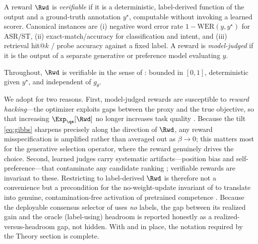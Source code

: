 \begin{definition}
\label{def:verifiable}
A reward $\Rwd$ is \emph{verifiable} if it is a deterministic, label-derived function of the output and a ground-truth annotation $y^\star$, computable without invoking a learned scorer. Canonical instances are (i) negative word error rate $1-\mathrm{WER}(y,y^\star)$ for ASR/ST, (ii) exact-match/accuracy for classification and intent, and (iii) retrieval hit$@k$ / probe accuracy against a fixed label. A reward is \emph{model-judged} if it is the output of a separate generative or preference model evaluating $y$.
\end{definition}

\begin{assumption}[Verifiability]
\label{ass:verifiable}
Throughout, $\Rwd$ is verifiable in the sense of : bounded in $[0,1]$, deterministic given $y^\star$, and independent of $g_\theta$.
\end{assumption}

We adopt  for two reasons. First, model-judged rewards are susceptible to \emph{reward hacking}---the optimizer exploits gaps between the proxy and the true objective, so that increasing $\Exp_{\qs}[\Rwd]$ no longer increases task quality \citep{skalse2022rewardhacking,gao2023overopt}. Because the tilt \eqref{eq:gibbs} sharpens precisely along the direction of $\Rwd$, any reward misspecification is amplified rather than averaged out as $\beta\to 0$; this matters most for the generative selection operator, where the reward genuinely drives the choice. Second, learned judges carry systematic artifacts---position bias and self-preference---that contaminate any candidate ranking \citep{positionbias2024,selfpreference2024}; verifiable rewards are invariant to these. Restricting to label-derived $\Rwd$ is therefore not a convenience but a precondition for the no-weight-update invariant of  to translate into genuine, contamination-free activation of pretrained competence \citep{tulu3}. Because the deployable consensus selector of  uses \emph{no} labels, the gap between its realized gain and the oracle (label-using) headroom is reported honestly as a realized-versus-headroom gap, not hidden. With  and  in place, the notation required by the Theory section is complete.